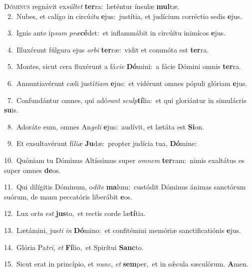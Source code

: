 \lettrine{\initial\textcolor{\initialcolor}{D}}{óminus} regnávit ex\-\textit{súl}\-\textit{tet} \textbf{ter}\-ra:~\star læténtur ínsulæ \textbf{mul}\-tæ.\\
{\numbfont\textcolor{\numbcolor}{~2.}}~Nubes, et calígo in circú\-\textit{i}\-\textit{tu} \textbf{e}\-jus:~\star justítia, et judícium corréctio sedis \textbf{e}\-jus.\par
{\numbfont\textcolor{\numbcolor}{~3.}}~Ignis ante ip\textit{sum} \textit{præ}\-\textbf{cé}det:~\star et inflammábit in circúitu inimícos \textbf{e}\-jus.\par
{\numbfont\textcolor{\numbcolor}{~4.}}~Illuxérunt fúlgura ejus \textit{or}\-\textit{bi} \textbf{ter}\-ræ:~\star vidit et commóta est \textbf{ter}\-ra.\par
{\numbfont\textcolor{\numbcolor}{~5.}}~Montes, sicut cera fluxérunt a fá\-\textit{ci}\-\textit{e} \textbf{Dó}\-mini:~\star a fácie Dómini omnis \textbf{ter}\-ra.\par
{\numbfont\textcolor{\numbcolor}{~6.}}~Annuntiavérunt cæli justí\-\textit{ti}\-\textit{am} \textbf{e}\-jus:~\star et vidérunt omnes pópuli glóriam \textbf{e}\-jus.\par
{\numbfont\textcolor{\numbcolor}{~7.}}~Confundántur omnes, qui adó\textit{rant} \textit{sculp}\-\textbf{tí}lia:~\star et qui gloriántur in simulácris \textbf{su}\-is.\par
{\numbfont\textcolor{\numbcolor}{~8.}}~Adoráte eum, omnes An\-\textit{ge}\-\textit{li} \textbf{e}\-jus:~\star audívit, et lætáta est \textbf{Si}\-on.\par
{\numbfont\textcolor{\numbcolor}{~9.}}~Et exsultavérunt fí\-\textit{li}\-\textit{æ} \textbf{Ju}\-dæ:~\star propter judícia tua, \textbf{Dó}\-mine:\par
{\numbfont\textcolor{\numbcolor}{10.}}~Quóniam tu Dóminus Altíssimus super \textit{om}\-\textit{nem} \textbf{ter}\-ram:~\star nimis exaltátus es super omnes \textbf{de}\-os.\par
{\numbfont\textcolor{\numbcolor}{11.}}~Qui dilígitis Dóminum, o\-\textit{dí}\-\textit{te} \textbf{ma}\-lum:~\star custódit Dóminus ánimas sanctórum suórum, de manu peccatóris liberábit \textbf{e}\-os.\par
{\numbfont\textcolor{\numbcolor}{12.}}~Lux or\textit{ta} \textit{est} \textbf{jus}\-to,~\star et rectis corde læ\-\textbf{tí}\-tia.\par
{\numbfont\textcolor{\numbcolor}{13.}}~Lætámini, jus\textit{ti} \textit{in} \textbf{Dó}\-mino:~\star et confitémini memóriæ sanctificatiónis \textbf{e}\-jus.\par
{\numbfont\textcolor{\numbcolor}{14.}}~Glória Pa\-\textit{tri}\-, \textit{et} \textbf{Fí}\-lio,~\star et Spirítui \textbf{Sanc}\-to.\par
{\numbfont\textcolor{\numbcolor}{15.}}~Sicut erat in princípio, et \textit{nunc}\-, \textit{et} \textbf{sem}\-per,~\star et in sǽcula sæculórum. \textbf{A}\-men.\par

